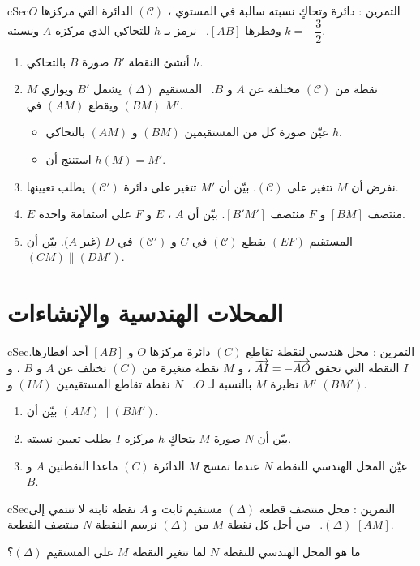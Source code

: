 \documentclass[12pt,a4paper]{article}
\newenvironment{BOX}[2]{\begin{otherlanguage}{english}\begin{arbox}{#1}{#2}}{\end{arbox}\end{otherlanguage}}
\newcounter{exo}
\newenvironment{tamrin}[1]{\stepcounter{exo}\begin{BOX}{cSec}{التمرين \theexo: #1}}{\end{BOX}}
\newenvironment{sq}{\begin{itemize}[leftmargin=2.4em,itemsep=3pt]}{\end{itemize}}
\newcommand{\qa}{\item[(أ)]}\newcommand{\qb}{\item[(ب)]}\newcommand{\qc}{\item[(جـ)]}\newcommand{\qd}{\item[(د)]}\newcommand{\qe}{\item[(هـ)]}
\begin{document}
\begin{tamrin}{دائرة وتحاكٍ نسبته سالبة}
في المستوي ، $(\mathcal C)$ الدائرة التي مركزها $O$ وقطرها $[AB]$. \ نرمز بـ $h$ للتحاكي الذي مركزه $A$ ونسبته $k=-\dfrac32$.
\begin{enumerate}
\item أنشئ النقطة $B'$ صورة $B$ بالتحاكي $h$.
\item $M$ نقطة من $(\mathcal C)$ مختلفة عن $A$ و $B$. \ المستقيم $(\Delta)$ يشمل $B'$ ويوازي $(BM)$ ويقطع $(AM)$ في $M'$.
\begin{sq}
\qa عيّن صورة كل من المستقيمين $(BM)$ و $(AM)$ بالتحاكي $h$.
\qb استنتج أن $h(M)=M'$.
\end{sq}
\item نفرض أن $M$ تتغير على $(\mathcal C)$. بيّن أن $M'$ تتغير على دائرة $(\mathcal C')$ يطلب تعيينها.
\item $E$ منتصف $[BM]$ و $F$ منتصف $[B'M']$. بيّن أن $A$ ، $E$ و $F$ على استقامة واحدة.
\item المستقيم $(EF)$ يقطع $(\mathcal C)$ في $C$ و $(\mathcal C')$ في $D$ (غير $A$). بيّن أن $(CM)\parallel(DM')$.
\end{enumerate}
\end{tamrin}

\section{المحلات الهندسية والإنشاءات}
\begin{tamrin}{محل هندسي لنقطة تقاطع}
$(C)$ دائرة مركزها $O$ و $[AB]$ أحد أقطارها. \ $I$ النقطة التي تحقق $\overrightarrow{AI}=-\overrightarrow{AO}$ ، و $M$ نقطة متغيرة من $(C)$ تختلف عن $A$ و $B$ ، و $M'$ نظيرة $M$ بالنسبة لـ $O$. \ $N$ نقطة تقاطع المستقيمين $(IM)$ و $(BM')$.
\begin{enumerate}
\item بيّن أن $(AM)\parallel(BM')$.
\item بيّن أن $N$ صورة $M$ بتحاكٍ $h$ مركزه $I$ يطلب تعيين نسبته.
\item عيّن المحل الهندسي للنقطة $N$ عندما تمسح $M$ الدائرة $(C)$ ماعدا النقطتين $A$ و $B$.
\end{enumerate}
\end{tamrin}

\begin{tamrin}{محل منتصف قطعة}
$(\Delta)$ مستقيم ثابت و $A$ نقطة ثابتة لا تنتمي إلى $(\Delta)$. \ من أجل كل نقطة $M$ من $(\Delta)$ نرسم النقطة $N$ منتصف القطعة $[AM]$.\par
ما هو المحل الهندسي للنقطة $N$ لما تتغير النقطة $M$ على المستقيم $(\Delta)$؟
\end{tamrin}
\end{document}

